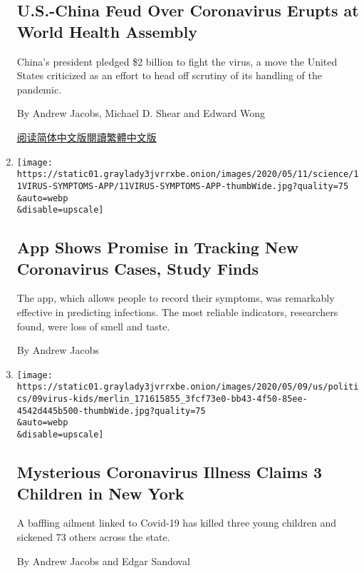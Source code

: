 \begin{enumerate}
  \hypertarget{us-china-feud-over-coronavirus-erupts-at-world-health-assembly}{%
  \subsection{U.S.-China Feud Over Coronavirus Erupts at World Health
  Assembly}\label{us-china-feud-over-coronavirus-erupts-at-world-health-assembly}}

  China's president pledged \$2 billion to fight the virus, a move the
  United States criticized as an effort to head off scrutiny of its
  handling of the pandemic.

  By Andrew Jacobs, Michael D. Shear and Edward Wong

  \href{https://cn.nytimes3xbfgragh.onion/world/20200519/coronavirus-who-china-trump/}{阅读简体中文版}\href{https://cn.nytimes3xbfgragh.onion/world/20200519/coronavirus-who-china-trump/zh-hant/}{閱讀繁體中文版}
\item
  \href{/2020/05/11/health/coronavirus-symptoms-app.html}{}

  \texttt{[image: https://static01.graylady3jvrrxbe.onion/images/2020/05/11/science/11VIRUS-SYMPTOMS-APP/11VIRUS-SYMPTOMS-APP-thumbWide.jpg?quality=75\\\&auto=webp\\\&disable=upscale]}

  \hypertarget{app-shows-promise-in-tracking-new-coronavirus-cases-study-finds}{%
  \subsection{App Shows Promise in Tracking New Coronavirus Cases, Study
  Finds}\label{app-shows-promise-in-tracking-new-coronavirus-cases-study-finds}}

  The app, which allows people to record their symptoms, was remarkably
  effective in predicting infections. The most reliable indicators,
  researchers found, were loss of smell and taste.

  By Andrew Jacobs
\item
  \href{/2020/05/09/health/mysterious-coronavirus-illness-claims-3-children-in-new-york.html}{}

  \texttt{[image: https://static01.graylady3jvrrxbe.onion/images/2020/05/09/us/politics/09virus-kids/merlin\_171615855\_3fcf73e0-bb43-4f50-85ee-4542d445b500-thumbWide.jpg?quality=75\\\&auto=webp\\\&disable=upscale]}

  \hypertarget{mysterious-coronavirus-illness-claims-3-children-in-new-york}{%
  \subsection{Mysterious Coronavirus Illness Claims 3 Children in New
  York}\label{mysterious-coronavirus-illness-claims-3-children-in-new-york}}

  A baffling ailment linked to Covid-19 has killed three young children
  and sickened 73 others across the state.

  By Andrew Jacobs and Edgar Sandoval
\end{enumerate}

